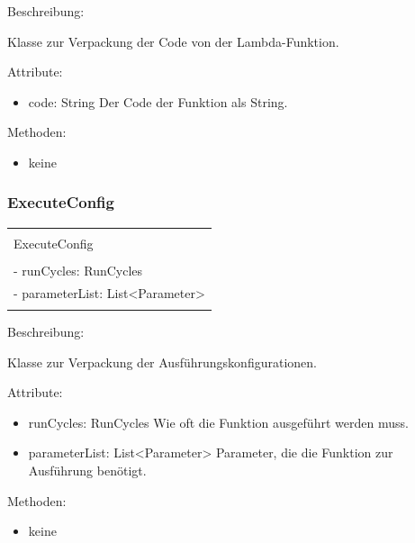 \documentclass[a4paper,20pt,oneside]{book}
\begin{document}
	\raggedright
	\vspace{0.5cm}
	Beschreibung:
	
	Klasse zur Verpackung der Code von der Lambda-Funktion.
	
	\vspace{0.5cm}
	Attribute:
	\begin{itemize}
    \item code: String \linebreak
    Der Code der Funktion als String.
	\end{itemize}
	
	Methoden:
	\begin{itemize}
	\item keine
	\end{itemize}
	
	\subsubsection{ExecuteConfig}
		\centering
	\begin{tabular}{|l|}
	\hline \\
	ExecuteConfig\\
	\hline \\
	- runCycles: RunCycles\\
    - parameterList: List<Parameter>\\
   
    \hline \\
	\hline 
	\end{tabular}
	
	\raggedright
	\vspace{0.5cm}
	Beschreibung:
	
	Klasse zur Verpackung der Ausführungskonfigurationen.
	
	\vspace{0.5cm}
	Attribute:
	\begin{itemize}
	\item runCycles: RunCycles \linebreak
	Wie oft die Funktion ausgeführt werden muss.
    \item parameterList: List<Parameter> \linebreak
    Parameter, die die Funktion zur Ausführung benötigt.
	\end{itemize}
	
	Methoden:
	\begin{itemize}
	\item keine
	\end{itemize}
	
\end{document}
